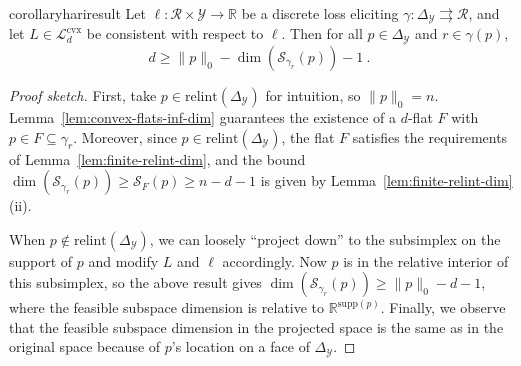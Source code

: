 \documentclass[anon,12pt]{colt2021} %
\newcommand{\Comments}{1}
\newcommand{\mynote}[2]{\ifnum\Comments=1\textcolor{#1}{#2}\fi}
\newcommand{\mytodo}[2]{\ifnum\Comments=1%
	\todo[linecolor=#1!80!black,backgroundcolor=#1,bordercolor=#1!80!black]{#2}\fi}
\newcommand{\jessiet}[1]{\mytodo{purple!20!white}{JF: #1}}
\newcommand{\bo}[1]{\mynote{blue}{[Bo: #1]}}
\newcommand{\btw}[1]{\mytodo{orange!80!white}{BTW: #1}}
\newcommand{\reals}{\mathbb{R}}
\newcommand{\simplex}{\Delta_\Y}
\newcommand{\relint}[1]{\mathrm{relint}(#1)}
\newcommand{\ccdim}{\mathrm{cc\,dim}}
\newcommand{\supp}{\mathrm{supp}}
\newcommand{\codim}{\mathrm{codim}}
\newcommand{\Lcvx}{\mathcal{L}^{\mathrm{cvx}}}
\newcommand{\R}{\mathcal{R}}
\newcommand{\Sc}{\mathcal{S}}  %
\newcommand{\Scr}{\mathcal{S}}  %
\newcommand{\Y}{\mathcal{Y}}
\newcommand{\toto}{\rightrightarrows}
\begin{document}
\begin{restatable}{corollary}{hariresult}\label{cor:fsd-bound}
	Let $\ell:\R \times \Y \to \reals$ be a discrete loss eliciting $\gamma:\simplex \toto \R$, and let $L \in \Lcvx_d$ be consistent with respect to $\ell$.
	Then for all $p \in \simplex$ and $r \in \gamma(p)$,
	\begin{equation}
	  d \geq \|p\|_0 - \dim(\Sc_{\gamma_r}(p)) - 1~.~
	\end{equation}
\end{restatable}
\begin{proof}[Proof sketch]
	First, take $p \in \relint{\simplex}$ for intuition, so $\|p\|_0 = n$.
	Lemma~\ref{lem:convex-flats-inf-dim} guarantees the existence of a $d$-flat $F$ with $p \in F \subseteq \gamma_r$.
	Moreover, since $p \in \relint{\simplex}$, the flat $F$ satisfies the requirements of Lemma~\ref{lem:finite-relint-dim}, and the bound $\dim(\Sc_{\gamma_r}(p)) \geq \Scr_F(p) \geq n - d- 1$ is given by Lemma~\ref{lem:finite-relint-dim} (ii).

	When $p \not \in \relint{\simplex}$, we can loosely ``project down'' to the subsimplex on the support of $p$ and modify $L$ and $\ell$ accordingly.
	Now $p$ is in the relative interior of this subsimplex, so the above result gives $\dim(\Sc_{\gamma_r}(p)) \geq \|p\|_0 - d - 1$, where the feasible subspace dimension is relative to $\reals^{\supp(p)}$.
	Finally, we observe that the feasible subspace dimension in the projected space is the same as in the original space because of $p$'s location on a face of $\simplex$.
\end{proof}
\end{document}
